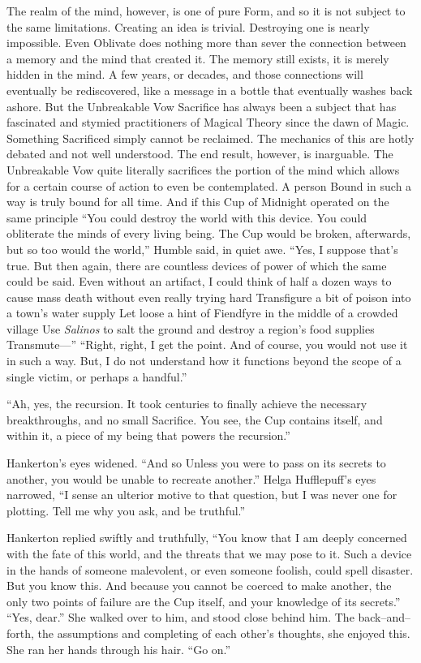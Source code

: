 The realm of the mind, however, is one of pure Form, and so it is not subject to the same limitations. Creating an idea is trivial. Destroying one is nearly impossible. Even Oblivate does nothing more than sever the connection between a memory and the mind that created it. The memory still exists, it is merely hidden in the mind. A few years, or decades, and those connections will eventually be rediscovered, like a message in a bottle that eventually washes back ashore. But the Unbreakable Vow{\el}
\SmallVSpace
Sacrifice has always been a subject that has fascinated and stymied practitioners of Magical Theory since the dawn of Magic. Something Sacrificed simply cannot be reclaimed. The mechanics of this are hotly debated and not well understood. The end result, however, is inarguable. The Unbreakable Vow quite literally sacrifices the portion of the mind which allows for a certain course of action to even be contemplated. A person Bound in such a way is truly bound for all time. And if this Cup of Midnight operated on the same principle{\el}
\SomeVSpace
“You could destroy the world with this device. You could obliterate the minds of every living being. The Cup would be broken, afterwards, but so too would the world,” Humble said, in quiet awe.
\SmallVSpace
“Yes, I suppose that’s true. But then again, there are countless devices of power of which the same could be said. Even without an artifact, I could think of half a dozen ways to cause mass death without even really trying hard{\el} Transfigure a bit of poison into a town’s water supply{\el} Let loose a hint of Fiendfyre in the middle of a crowded village{\el} Use \emph{Salinos} to salt the ground and destroy a region’s food supplies{\el} Transmute\mbox{---}”
\SmallVSpace
“Right, right, I get the point. And of course, you would not use it in such a way. But, I do not understand how it functions beyond the scope of a single victim, or perhaps a handful.”

“Ah, yes, the recursion. It took centuries to finally achieve the necessary breakthroughs, and no small Sacrifice. You see, the Cup contains itself, and within it, a piece of my being that powers the recursion.”

Hankerton’s eyes widened. “And so{\el} Unless you were to pass on its secrets to another, you would be unable to recreate another.”
\SmallVSpace
Helga Hufflepuff’s eyes narrowed, “I sense an ulterior motive to that question, but I was never one for plotting. Tell me why you ask, and be truthful.”

Hankerton replied swiftly and truthfully, “You know that I am deeply concerned with the fate of this world, and the threats that we may pose to it. Such a device in the hands of someone malevolent, or even someone foolish, could spell disaster. But you know this. And because you cannot be coerced to make another, the only two points of failure are the Cup itself, and your knowledge of its secrets.”
\SmallVSpace
“Yes, dear.” She walked over to him, and stood close behind him. The back\mbox{--}and\mbox{--}forth, the assumptions and completing of each other’s thoughts, she enjoyed this. She ran her hands through his hair. “Go on.”

